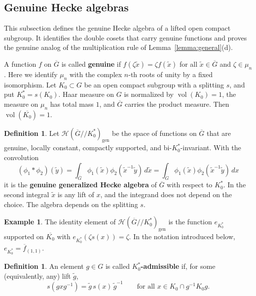 \documentclass[12pt,letterpaper]{amsart}
\numberwithin{equation}{section}
\theoremstyle{definition}
\newtheorem{definition}[theorem]{Definition}
\newtheorem{example}[theorem]{Example}
\theoremstyle{remark}
\DeclareMathOperator{\vol}{vol}
\newcommand{\cH}{\mathcal{H}}
\newcommand{\Gbar}{\overline{G}}
\newcommand{\gen}{\mathrm{gen}}
\newcommand{\fbar}{\overline{f}}
\begin{document}
\subsection{Genuine Hecke algebras}
This subsection defines the genuine Hecke algebra of a lifted open
compact subgroup. It identifies the double cosets that carry genuine
functions and proves the genuine analog of the multiplication rule of
Lemma~\ref{lemma:general}(d).

A function $f$ on $\Gbar$ is called \textbf{genuine} if
$f(\zeta\tilde x)=\zeta f(\tilde x)$ for all $\tilde x\in\Gbar$ and
$\zeta\in\mu_n$. Here we identify $\mu_n$ with the complex $n$-th roots
of unity by a fixed isomorphism. Let $K_0\subset G$ be an open compact
subgroup with a splitting $s$, and put $K_0^*=s(K_0)$. Haar measure on
$G$ is normalized by $\vol(K_0)=1$, the measure on $\mu_n$ has total
mass $1$, and $\Gbar$ carries the product measure. Then
$\vol(\overline{K_0})=1$.

\begin{definition}
\label{def:genuineHecke}
Let $\cH(\Gbar/\!/K_0^*)_{\gen}$ be the space of functions on $\Gbar$
that are genuine, locally constant, compactly supported, and
bi-$K_0^*$-invariant. With the convolution
\[
(\phi_1*\phi_2)(\tilde y)=\int_{\Gbar}\phi_1(\tilde x)
\phi_2(\tilde x^{-1}\tilde y)\,d\tilde x
=\int_G\phi_1(\tilde x)\phi_2(\tilde x^{-1}\tilde y)\,dx
\]
it is the \textbf{genuine generalized Hecke algebra} of $\Gbar$ with
respect to $K_0^*$. In the second integral $\tilde x$ is any lift of
$x$, and the integrand does not depend on the choice. The algebra
depends on the splitting $s$.
\end{definition}

\begin{example}
\label{ex:identity}
The identity element of $\cH(\Gbar/\!/K_0^*)_{\gen}$ is the function
$e_{K_0^*}$ supported on $\overline{K_0}$ with
$e_{K_0^*}(\zeta s(x))=\zeta$. In the notation introduced below,
$e_{K_0^*}=\fbar_{(1,1)}$.
\end{example}

\begin{definition}
\label{def:admissible}
An element $g\in G$ is called \textbf{$K_0^*$-admissible} if, for some
(equivalently, any) lift $\tilde g$,
\begin{equation}
\label{eq:admissible}
s(gxg^{-1})=\tilde g\,s(x)\,\tilde g^{-1}\qquad
\mbox{for all }x\in K_0\cap g^{-1}K_0g.
\end{equation}
\end{definition}
\end{document}
